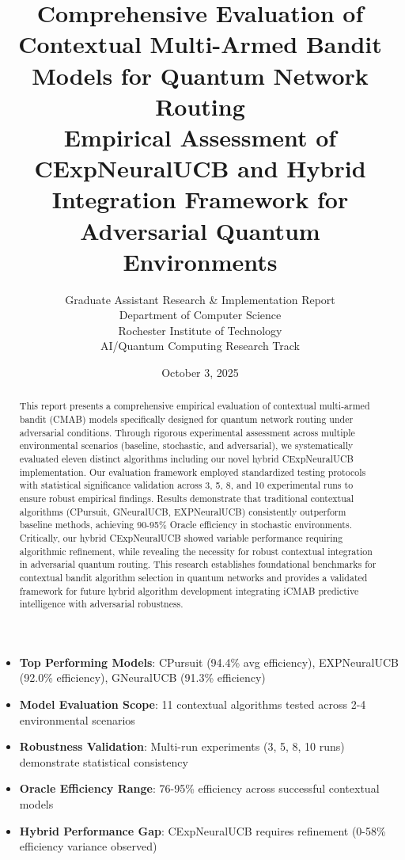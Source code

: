 \documentclass[12pt,a4paper]{article}
\title{\textbf{Comprehensive Evaluation of Contextual Multi-Armed Bandit Models for Quantum Network Routing}\\
\large{Empirical Assessment of CExpNeuralUCB and Hybrid Integration Framework for Adversarial Quantum Environments}}
\author{Graduate Assistant Research \& Implementation Report\\ 
Department of Computer Science \\ 
Rochester Institute of Technology \\ 
AI/Quantum Computing Research Track}
\date{October 3, 2025}
\newcommand{\performance}[1]{\textcolor{performancecolor}{\textbf{#1}}}
\newcommand{\stochastic}[1]{\textcolor{stochasticcolor}{\textbf{#1}}}
\newcommand{\critical}[1]{\textcolor{criticalcolor}{\textbf{#1}}}
\newcommand{\success}[1]{\textcolor{successcolor}{\textbf{#1}}}
\begin{document}
\maketitle

\begin{abstract}
This report presents a comprehensive empirical evaluation of contextual multi-armed bandit (CMAB) models specifically designed for quantum network routing under adversarial conditions. Through rigorous experimental assessment across multiple environmental scenarios (baseline, stochastic, and adversarial), we systematically evaluated eleven distinct algorithms including our novel hybrid CExpNeuralUCB implementation. Our evaluation framework employed standardized testing protocols with statistical significance validation across 3, 5, 8, and 10 experimental runs to ensure robust empirical findings. Results demonstrate that traditional contextual algorithms (CPursuit, GNeuralUCB, EXPNeuralUCB) consistently outperform baseline methods, achieving 90-95\% Oracle efficiency in stochastic environments. Critically, our hybrid CExpNeuralUCB showed variable performance requiring algorithmic refinement, while revealing the necessity for robust contextual integration in adversarial quantum routing. This research establishes foundational benchmarks for contextual bandit algorithm selection in quantum networks and provides a validated framework for future hybrid algorithm development integrating iCMAB predictive intelligence with adversarial robustness.
\end{abstract}

\newpage
{\tableofcontents}

\newpage

\begin{tcolorbox}[colback=highlightcolor!30,colframe=performancecolor,title=\textbf{Key Experimental Results Summary}]
\begin{itemize}
\item \performance{Top Performing Models}: CPursuit (94.4\% avg efficiency), EXPNeuralUCB (92.0\% efficiency), GNeuralUCB (91.3\% efficiency)
\item \stochastic{Model Evaluation Scope}: 11 contextual algorithms tested across 2-4 environmental scenarios  
\item \success{Robustness Validation}: Multi-run experiments (3, 5, 8, 10 runs) demonstrate statistical consistency
\item \performance{Oracle Efficiency Range}: 76-95\% efficiency across successful contextual models
\item \critical{Hybrid Performance Gap}: CExpNeuralUCB requires refinement (0-58\% efficiency variance observed)
\end{itemize}
\end{tcolorbox}
\end{document}
